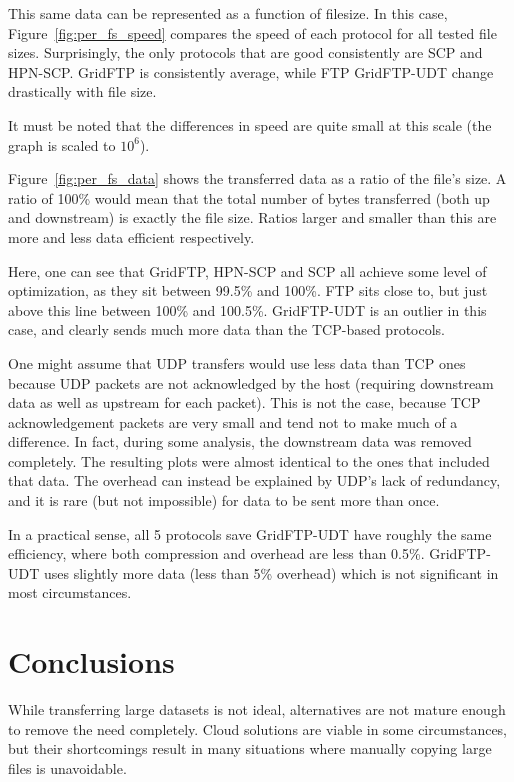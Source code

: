 \documentclass{sig-alternate-05-2015}
\begin{document}
This same data can be represented as a function of filesize. In this case, Figure~\ref{fig:per_fs_speed} compares the speed of each protocol for all tested file sizes. Surprisingly, the only protocols that are good consistently are SCP and HPN-SCP. GridFTP is consistently average, while FTP GridFTP-UDT change drastically with file size. 

It must be noted that the differences in speed are quite small at this scale (the graph is scaled to $10^6$).

Figure~\ref{fig:per_fs_data} shows the transferred data as a ratio of the file's size. A ratio of 100\% would mean that the total number of bytes transferred (both up and downstream) is exactly the file size. Ratios larger and smaller than this are more and less data efficient respectively.

Here, one can see that GridFTP, HPN-SCP and SCP all achieve some level of optimization, as they sit between 99.5\% and 100\%. FTP sits close to, but just above this line between 100\% and 100.5\%. GridFTP-UDT is an outlier in this case, and clearly sends much more data than the TCP-based protocols.

One might assume that UDP transfers would use less data than TCP ones because UDP packets are not acknowledged by the host (requiring downstream data as well as upstream for each packet). This is not the case, because TCP acknowledgement packets are very small and tend not to make much of a difference. In fact, during some analysis, the downstream data was removed completely. The resulting plots were almost identical to the ones that included that data. The overhead can instead be explained by UDP's lack of redundancy, and it is rare (but not impossible) for data to be sent more than once.

In a practical sense, all 5 protocols save GridFTP-UDT have roughly the same efficiency, where both compression and overhead are less than 0.5\%. GridFTP-UDT uses slightly more data (less than 5\% overhead) which is not significant in most circumstances.

\section{Conclusions}
While transferring large datasets is not ideal, alternatives are not mature enough to remove the need completely. Cloud solutions are viable in some circumstances, but their shortcomings result in many situations where manually copying large files is unavoidable.
\end{document}
